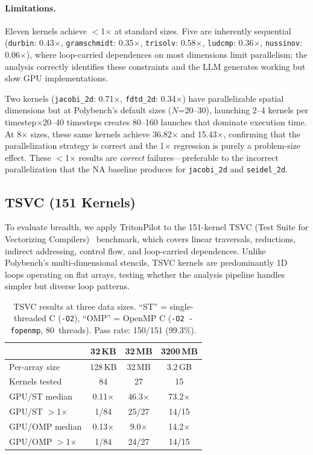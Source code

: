 \documentclass[sigconf]{acmart}
\newcommand{\sysname}{TritonPilot\xspace}
\begin{document}
\paragraph{Limitations.}
Eleven kernels achieve $<$1$\times$ at standard sizes.  Five are
inherently sequential (\texttt{durbin}: 0.43$\times$,
\texttt{gramschmidt}: 0.35$\times$, \texttt{trisolv}: 0.58$\times$,
\texttt{ludcmp}: 0.36$\times$, \texttt{nussinov}: 0.06$\times$), where
loop-carried dependences on most dimensions limit parallelism; the
analysis correctly identifies these constraints and the LLM generates
working but slow GPU implementations.

Two kernels (\texttt{jacobi\_2d}: 0.71$\times$, \texttt{fdtd\_2d}:
0.34$\times$) have parallelizable spatial dimensions but at Polybench's
default sizes ($N$=20--30), launching 2--4 kernels per
timestep$\times$20--40 timesteps creates 80--160 launches that dominate
execution time.  At 8$\times$ sizes, these same kernels achieve
36.82$\times$ and 15.43$\times$, confirming that the parallelization
strategy is correct and the 1$\times$ regression is purely a
problem-size effect.  These $<$1$\times$ results are \emph{correct}
failures---preferable to the incorrect parallelization that the NA
baseline produces for \texttt{jacobi\_2d} and \texttt{seidel\_2d}.


\subsection{TSVC (151 Kernels)}
\label{sec:tsvc}

To evaluate breadth, we apply \sysname to the 151-kernel TSVC (Test
Suite for Vectorizing Compilers)~\cite{callahan1988tsvc} benchmark,
which covers linear traversals, reductions, indirect addressing,
control flow, and loop-carried dependences.  Unlike Polybench's
multi-dimensional stencils, TSVC kernels are predominantly 1D loops
operating on flat arrays, testing whether the analysis pipeline handles
simpler but diverse loop patterns.

\begin{table}[t]
  \caption{TSVC results at three data sizes.  ``ST'' = single-threaded
    C (\texttt{-O2}), ``OMP'' = OpenMP C (\texttt{-O2 -fopenmp},
    80~threads). Pass rate: 150/151 (99.3\%).}
  \label{tab:tsvc}
  \centering\small
  \begin{tabular}{lccc}
    \toprule
    & \textbf{32\,KB} & \textbf{32\,MB} & \textbf{3200\,MB} \\
    \midrule
    Per-array size     & 128\,KB & 32\,MB & 3.2\,GB \\
    Kernels tested     & 84      & 27     & 15      \\
    \midrule
    GPU/ST median      & 0.11$\times$ & 46.3$\times$ & 73.2$\times$ \\
    GPU/ST $>$1$\times$ & 1/84        & 25/27        & 14/15        \\
    \midrule
    GPU/OMP median     & 0.13$\times$ & 9.0$\times$  & 14.2$\times$ \\
    GPU/OMP $>$1$\times$& 1/84        & 24/27        & 14/15        \\
    \bottomrule
  \end{tabular}
\end{table}
\end{document}
